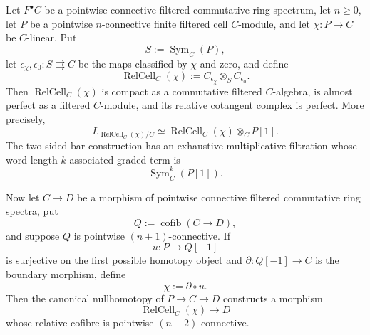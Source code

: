 \begin{lemma}
\label{lem:filtered-positive-relation-cell}
Let \(F^\bullet C\) be a pointwise connective filtered commutative ring
spectrum, let \(n\geq0\), let \(P\) be a pointwise \(n\)-connective finite
filtered cell \(C\)-module, and let \(\chi:P\to C\) be \(C\)-linear. Put
\[
    S:=\operatorname{Sym}_C(P),
\]
let \(\epsilon_\chi,\epsilon_0:S\rightrightarrows C\) be the maps classified
by \(\chi\) and zero, and define
\[
    \operatorname{RelCell}_C(\chi)
    :=
    C_{\epsilon_\chi}\otimes_SC_{\epsilon_0}.
\]
Then \(\operatorname{RelCell}_C(\chi)\) is compact as a commutative filtered \(C\)-algebra, is
almost perfect as a filtered \(C\)-module, and its relative cotangent complex
is perfect. More precisely,
\[
    L_{\operatorname{RelCell}_C(\chi)/C}
    \simeq
    \operatorname{RelCell}_C(\chi)\otimes_C P[1].
\]
The two-sided bar construction has an exhaustive multiplicative filtration
whose word-length \(k\) associated-graded term is
\[
    \operatorname{Sym}^k_C(P[1]).
\]

Now let \(C\to D\) be a morphism of pointwise connective filtered
commutative ring spectra, put
\[
    Q:=\operatorname{cofib}(C\to D),
\]
and suppose \(Q\) is pointwise \((n+1)\)-connective. If
\[
    u:P\longrightarrow Q[-1]
\]
is surjective on the first possible homotopy object and
\(\partial:Q[-1]\to C\) is the boundary morphism, define
\[
    \chi:=\partial\circ u.
\]
Then the canonical nullhomotopy of \(P\to C\to D\) constructs a morphism
\[
    \operatorname{RelCell}_C(\chi)\longrightarrow D
\]
whose relative cofibre is pointwise \((n+2)\)-connective.
\end{lemma}

